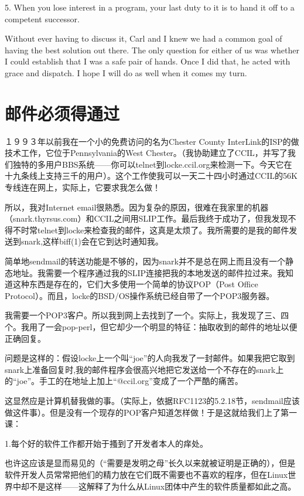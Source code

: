 \documentclass[a4paper,12pt,UTF8,twoside]{ctexbook}
\begin{document}
5. When you lose interest in a program, your last duty to it is to hand it off to a competent successor.

Without ever having to discuss it, Carl and I knew we had a common goal of having the best solution out there. The only question for either of us was whether I could establish that I was a safe pair of hands. Once I did that, he acted with grace and dispatch. I hope I will do as well when it comes my turn.

\chapter{邮件必须得通过}

１９９３年以前我在一个小的免费访问的名为Chester County InterLink的ISP的做技术工作，它位于Pennsylvania的West Chester。（我协助建立了CCIL，并写了我们独特的多用户BBS系统——你可以telnet到locke.ccil.org来检测一下。今天它在十九条线上支持三千的用户）。这个工作使我可以一天二十四小时通过CCIL的56K专线连在网上，实际上，它要求我怎么做！


所以，我对Internet email很熟悉。因为复杂的原因，很难在我家里的机器（snark.thyrsus.com）和CCIL之间用SLIP工作。最后我终于成功了，但我发现不得不时常telnet到locke来检查我的邮件，这真是太烦了。我所需要的是我的邮件发送到snark,这样biff(1)会在它到达时通知我。


简单地sendmail的转送功能是不够的，因为snark并不是总在网上而且没有一个静态地址。我需要一个程序通过我的SLIP连接把我的本地发送的邮件拉过来。我知道这种东西是存在的，它们大多使用一个简单的协议POP（Post Office Protocol）。而且，locke的BSD/OS操作系统已经自带了一个POP3服务器。


我需要一个POP3客户。所以我到网上去找到了一个。实际上，我发现了三、四个。我用了一会pop-perl，但它却少一个明显的特征：抽取收到的邮件的地址以便正确回复。


问题是这样的：假设locke上一个叫“joe”的人向我发了一封邮件。如果我把它取到snark上准备回复时,我的邮件程序会很高兴地把它发送给一个不存在的snark上的“joe”。手工的在地址上加上“@ccil.org”变成了一个严酷的痛苦。


这显然应是计算机替我做的事。（实际上，依据RFC1123的5.2.18节，sendmail应该做这件事）。但是没有一个现存的POP客户知道怎样做！于是这就给我们上了第一课：

1.每个好的软件工作都开始于搔到了开发者本人的痒处。

也许这应该是显而易见的（“需要是发明之母”长久以来就被证明是正确的），但是软件开发人员常常把他们的精力放在它们既不需要也不喜欢的程序，但在Linux世界中却不是这样——这解释了为什么从Linux团体中产生的软件质量都如此之高。
\end{document}
